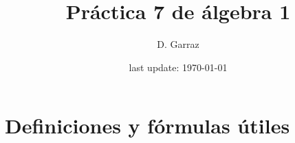 

\usepackage{polynom} %





\pagestyle{empty} %

\title{Práctica 7 de álgebra 1} %
\author{D. Garraz} %
\date{last update: \today} %

\maketitle  %

\newcommand{\polGen}[1]{\sumatoria{i=0}{n} #1_i X^i}

\section{Definiciones y fórmulas útiles}

